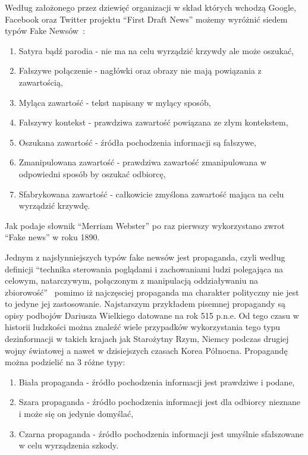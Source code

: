 Według założonego przez dziewięć organizacji w skład których wchodzą 
Google, Facebook oraz Twitter projektu ``First Draft News''
możemy wyróżnić siedem typów Fake Newsów~\cite{TypesOfFakeNews}:
\begin{enumerate}
    \item Satyra bądź parodia - nie ma na celu wyrządzić krzywdy ale może oszukać,
    \item Fałszywe połączenie - nagłówki oraz obrazy nie mają powiązania z zawartością,
    \item Myląca zawartość - tekst napisany w mylący sposób,
    \item Fałszywy kontekst - prawdziwa zawartość powiązana ze złym kontekstem,
    \item Oszukana zawartość - źródła pochodzenia informacji są fałszywe,
    \item Zmanipulowana zawartość - prawdziwa zawartość zmanipulowana w odpowiedni sposób by oszukać odbiorcę,
    \item Sfabrykowana zawartość - całkowicie zmyślona zawartość mająca na celu wyrządzić krzywdę.
\end{enumerate}
Jak podaje słownik ``Merriam Webster'' po raz pierwszy wykorzystano zwrot
``Fake news'' w roku 1890.


Jednym z najsłynniejszych typów fake newsów jest propaganda, czyli według 
definicji ``technika sterowania poglądami i zachowaniami ludzi polegająca na 
celowym, natarczywym, połączonym z manipulacją oddziaływaniu na zbiorowość''~\cite{SJP}
pomimo iż najczęsciej propaganda ma charakter polityczny nie jest to jedyne 
jej zastosowanie. Najstarszym przykładem pisemnej propagandy są opisy podbojów
Dariusza Wielkiego datowane na rok 515 p.n.e. Od tego czasu w historii ludzkości
można znaleźć wiele przypadków wykorzystania tego typu dezinformacji w takich krajach
jak Starożytny Rzym, Niemcy podczas drugiej wojny światowej a nawet w dzisiejszych 
czasach Korea Północna.
Propagandę można podzielić na 3 różne typy:
\begin{enumerate}
    \item Biała propaganda - źródło pochodzenia informacji jest prawdziwe i podane,
    \item Szara propaganda - źródło pochodzenia informacji jest dla odbiorcy nieznane i może się on jedynie domyślać,
    \item Czarna propaganda - źródło pochodzenia informacji jest umyślnie sfałszowane w celu wyrządzenia szkody.
\end{enumerate}


